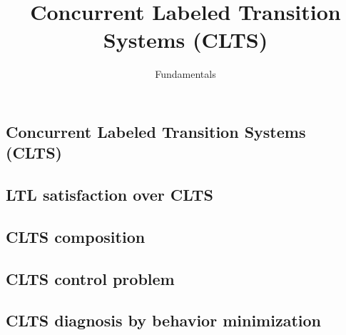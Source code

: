 \documentclass{article}
\title{Concurrent Labeled Transition Systems (CLTS)} %
\author{Fundamentals} %
\date{}
\begin{document}
\maketitle

\setcounter{section}{1} %
\setcounter{theorem}{1} %

\subsection{Concurrent Labeled Transition Systems (CLTS)}


\subsection{LTL satisfaction over CLTS}


%

%

\subsection{CLTS composition}


\subsection{CLTS control problem}


\subsection{CLTS diagnosis by behavior minimization}



%
\end{document}
